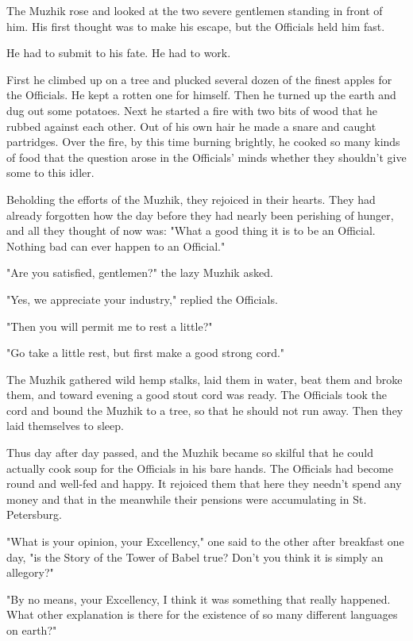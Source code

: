 The Muzhik rose and looked at the two severe gentlemen standing in
front of him. His first thought was to make his escape, but the
Officials held him fast.

He had to submit to his fate. He had to work.

First he climbed up on a tree and plucked several dozen of the finest
apples for the Officials. He kept a rotten one for himself. Then he
turned up the earth and dug out some potatoes. Next he started a fire
with two bits of wood that he rubbed against each other. Out of his
own hair he made a snare and caught partridges. Over the fire, by this
time burning brightly, he cooked so many kinds of food that the
question arose in the Officials' minds whether they shouldn't give
some to this idler.

Beholding the efforts of the Muzhik, they rejoiced in their hearts.
They had already forgotten how the day before they had nearly been
perishing of hunger, and all they thought of now was: "What a good
thing it is to be an Official. Nothing bad can ever happen to an
Official."

"Are you satisfied, gentlemen?" the lazy Muzhik asked.

"Yes, we appreciate your industry," replied the Officials.

"Then you will permit me to rest a little?"

"Go take a little rest, but first make a good strong cord."

The Muzhik gathered wild hemp stalks, laid them in water, beat them
and broke them, and toward evening a good stout cord was ready. The
Officials took the cord and bound the Muzhik to a tree, so that he
should not run away. Then they laid themselves to sleep.

Thus day after day passed, and the Muzhik became so skilful that he
could actually cook soup for the Officials in his bare hands. The
Officials had become round and well-fed and happy. It rejoiced them
that here they needn't spend any money and that in the meanwhile their
pensions were accumulating in St. Petersburg.

"What is your opinion, your Excellency," one said to the other after
breakfast one day, "is the Story of the Tower of Babel true? Don't you
think it is simply an allegory?"

"By no means, your Excellency, I think it was something that really
happened. What other explanation is there for the existence of so many
different languages on earth?"

